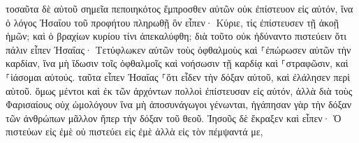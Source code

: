 \documentclass{openreader}
\begin{document}
τοσαῦτα δὲ αὐτοῦ σημεῖα πεποιηκότος ἔμπροσθεν αὐτῶν οὐκ ἐπίστευον εἰς αὐτόν, 
ἵνα ὁ λόγος Ἠσαΐου τοῦ προφήτου πληρωθῇ ὃν εἶπεν· Κύριε, τίς ἐπίστευσεν τῇ ἀκοῇ ἡμῶν; καὶ ὁ βραχίων κυρίου τίνι ἀπεκαλύφθη; 
διὰ τοῦτο οὐκ ἠδύναντο πιστεύειν ὅτι πάλιν εἶπεν Ἠσαΐας· 
Τετύφλωκεν αὐτῶν τοὺς ὀφθαλμοὺς καὶ ⸀ἐπώρωσεν αὐτῶν τὴν καρδίαν, ἵνα μὴ ἴδωσιν τοῖς ὀφθαλμοῖς καὶ νοήσωσιν τῇ καρδίᾳ καὶ ⸀στραφῶσιν, καὶ ⸀ἰάσομαι αὐτούς. 
ταῦτα εἶπεν Ἠσαΐας ⸀ὅτι εἶδεν τὴν δόξαν αὐτοῦ, καὶ ἐλάλησεν περὶ αὐτοῦ. 
ὅμως μέντοι καὶ ἐκ τῶν ἀρχόντων πολλοὶ ἐπίστευσαν εἰς αὐτόν, ἀλλὰ διὰ τοὺς Φαρισαίους οὐχ ὡμολόγουν ἵνα μὴ ἀποσυνάγωγοι γένωνται, 
ἠγάπησαν γὰρ τὴν δόξαν τῶν ἀνθρώπων μᾶλλον ἤπερ τὴν δόξαν τοῦ θεοῦ. 
Ἰησοῦς δὲ ἔκραξεν καὶ εἶπεν· Ὁ πιστεύων εἰς ἐμὲ οὐ πιστεύει εἰς ἐμὲ ἀλλὰ εἰς τὸν πέμψαντά με, 
\end{document}
